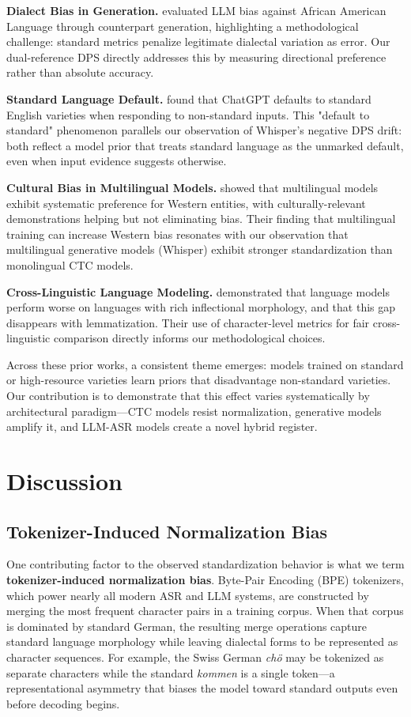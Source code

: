 \documentclass[11pt]{article}
\begin{document}
\textbf{Dialect Bias in Generation.} \citet{deas2023evaluation} evaluated LLM bias against African American Language through counterpart generation, highlighting a methodological challenge: standard metrics penalize legitimate dialectal variation as error. Our dual-reference DPS directly addresses this by measuring directional preference rather than absolute accuracy.

\textbf{Standard Language Default.} \citet{fleisig2024linguistic} found that ChatGPT defaults to standard English varieties when responding to non-standard inputs. This "default to standard" phenomenon parallels our observation of Whisper's negative DPS drift: both reflect a model prior that treats standard language as the unmarked default, even when input evidence suggests otherwise.

\textbf{Cultural Bias in Multilingual Models.} \citet{naous2024having} showed that multilingual models exhibit systematic preference for Western entities, with culturally-relevant demonstrations helping but not eliminating bias. Their finding that multilingual training can increase Western bias resonates with our observation that multilingual generative models (Whisper) exhibit stronger standardization than monolingual CTC models.

\textbf{Cross-Linguistic Language Modeling.} \citet{cotterell2018are} demonstrated that language models perform worse on languages with rich inflectional morphology, and that this gap disappears with lemmatization. Their use of character-level metrics for fair cross-linguistic comparison directly informs our methodological choices.

Across these prior works, a consistent theme emerges: models trained on standard or high-resource varieties learn priors that disadvantage non-standard varieties. Our contribution is to demonstrate that this effect varies systematically by architectural paradigm—CTC models resist normalization, generative models amplify it, and LLM-ASR models create a novel hybrid register.

\section{Discussion}

\subsection{Tokenizer-Induced Normalization Bias}

One contributing factor to the observed standardization behavior is what we term \textbf{tokenizer-induced normalization bias}. Byte-Pair Encoding (BPE) tokenizers, which power nearly all modern ASR and LLM systems, are constructed by merging the most frequent character pairs in a training corpus. When that corpus is dominated by standard German, the resulting merge operations capture standard language morphology while leaving dialectal forms to be represented as character sequences. For example, the Swiss German \textit{chö} may be tokenized as separate characters while the standard \textit{kommen} is a single token—a representational asymmetry that biases the model toward standard outputs even before decoding begins.
\end{document}
